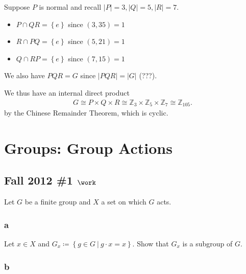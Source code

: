 \begin{solution}
Suppose \(P\) is normal and recall
\({\left\lvert {P} \right\rvert} = 3, {\left\lvert {Q} \right\rvert} = 5, {\left\lvert {R} \right\rvert} = 7\).

\begin{itemize}
\tightlist
\item
  \(P\cap QR = \left\{{e}\right\}\) since \((3, 35) = 1\)
\item
  \(R\cap PQ = \left\{{e}\right\}\) since \((5, 21) = 1\)
\item
  \(Q\cap RP = \left\{{e}\right\}\) since \((7, 15) = 1\)
\end{itemize}

We also have \(PQR = G\) since
\({\left\lvert {PQR} \right\rvert} = {\left\lvert {G} \right\rvert}\)
(???).

We thus have an internal direct product
\begin{align*}
G \cong P\times Q \times R \cong {\mathbb{Z}}_3 \times{\mathbb{Z}}_5 \times{\mathbb{Z}}_7 \cong {\mathbb{Z}}_{105}
.\end{align*}
by the Chinese Remainder Theorem, which is cyclic.

\end{solution}

\hypertarget{groups-group-actions}{%
\section{Groups: Group Actions}\label{groups-group-actions}}

\hypertarget{fall-2012-1-work}{%
\subsection{\texorpdfstring{Fall 2012 \#1
\(\work\)}{Fall 2012 \#1 \textbackslash work}}\label{fall-2012-1-work}}

Let \(G\) be a finite group and \(X\) a set on which \(G\) acts.

\hypertarget{a-14}{%
\subsubsection{a}\label{a-14}}

Let \(x\in X\) and
\(G_x \coloneqq\left\{{g\in G {~\mathrel{\Big|}~}g\cdot x = x}\right\}\).
Show that \(G_x\) is a subgroup of \(G\).

\hypertarget{b-14}{%
\subsubsection{b}\label{b-14}}

